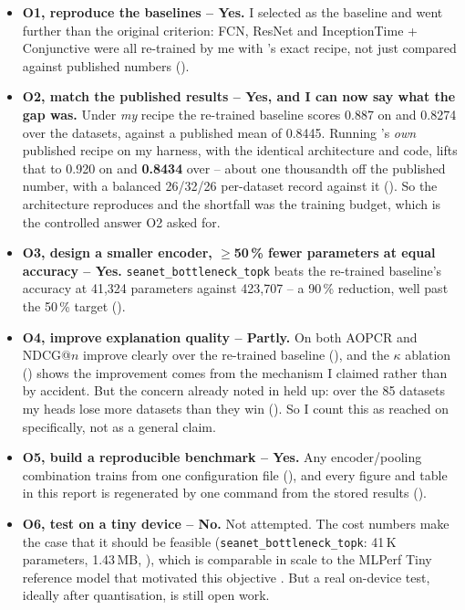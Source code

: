 \begin{itemize}\itemsep4pt
  \item \textbf{O1, reproduce the baselines -- Yes.} I selected \millet{} as the baseline and went
        further than the original criterion: FCN, ResNet and InceptionTime + Conjunctive were all
        re-trained by me with \seanet{}'s exact recipe, not just compared against published numbers
        ().

  \item \textbf{O2, match the published \millet{} results -- Yes, and I can now say what the gap
        was.} Under \emph{my} recipe the re-trained \millet{} baseline scores 0.887 on
        \webtraffic{} and 0.8274 over the \ucr{} datasets, against a published \ucr{} mean of
        0.8445. Running \millet{}'s \emph{own} published recipe on my harness, with the identical
        architecture and code, lifts that to 0.920 on \webtraffic{} and \textbf{0.8434} over
        \ucr{} -- about one thousandth off the published number, with a balanced 26/32/26
        per-dataset record against it (). So the architecture reproduces and
        the shortfall was the training budget, which is the controlled answer O2 asked for.

  \item \textbf{O3, design a smaller encoder, $\geq$50\,\% fewer parameters at equal accuracy --
        Yes.} \texttt{seanet\_bottleneck\_topk} beats the re-trained \millet{} baseline's accuracy
        at 41{,}324 parameters against 423{,}707 -- a 90\,\% reduction, well past the 50\,\% target
        ().

  \item \textbf{O4, improve explanation quality -- Partly.} On \webtraffic{} both AOPCR and NDCG@$n$
        improve clearly over the re-trained baseline (), and the
        $\kappa$ ablation () shows the improvement comes from the mechanism
        I claimed rather than by accident. But the concern already noted in 
        held up: over the 85 \ucr{} datasets my heads lose more datasets than they win
        (). So I count this as reached on \webtraffic{} specifically, not as a
        general claim.

  \item \textbf{O5, build a reproducible benchmark -- Yes.} Any encoder/pooling combination trains
        from one configuration file (), and every figure and table in this
        report is regenerated by one command from the stored results ().

  \item \textbf{O6, test on a tiny device -- No.} Not attempted. The cost numbers make the case that
        it should be feasible (\texttt{seanet\_bottleneck\_topk}: 41\,K parameters, 1.43\,MB,
        ), which is comparable in scale to the MLPerf Tiny reference model that
        motivated this objective \citep{banbury2021mlperftiny}. But a real on-device test, ideally
        after quantisation, is still open work.
\end{itemize}

